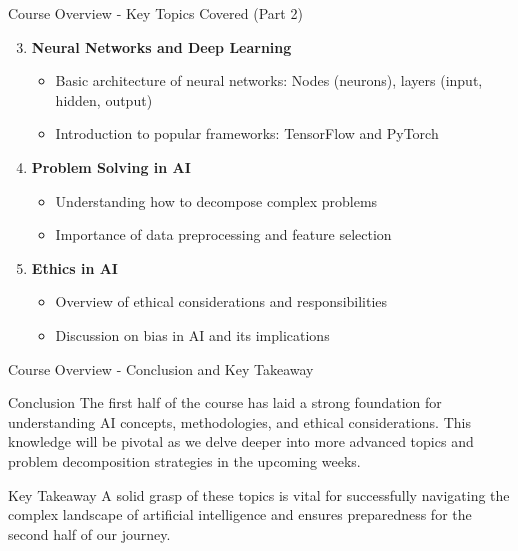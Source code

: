\documentclass[aspectratio=169]{beamer}
\begin{document}
\begin{frame}[fragile]{Course Overview - Key Topics Covered (Part 2)}
    \begin{enumerate}
        \setcounter{enumi}{2}
        \item \textbf{Neural Networks and Deep Learning}
        \begin{itemize}
            \item Basic architecture of neural networks: Nodes (neurons), layers (input, hidden, output)
            \item Introduction to popular frameworks: TensorFlow and PyTorch 
        \end{itemize}
        \item \textbf{Problem Solving in AI} 
        \begin{itemize}
            \item Understanding how to decompose complex problems 
            \item Importance of data preprocessing and feature selection
        \end{itemize}
        \item \textbf{Ethics in AI} 
        \begin{itemize}
            \item Overview of ethical considerations and responsibilities
            \item Discussion on bias in AI and its implications
        \end{itemize}
    \end{enumerate}
\end{frame}

\begin{frame}[fragile]{Course Overview - Conclusion and Key Takeaway}
    \begin{block}{Conclusion}
        The first half of the course has laid a strong foundation for understanding AI concepts, methodologies, and ethical considerations.
        This knowledge will be pivotal as we delve deeper into more advanced topics and problem decomposition strategies in the upcoming weeks.
    \end{block}
    
    \begin{block}{Key Takeaway}
        A solid grasp of these topics is vital for successfully navigating the complex landscape of artificial intelligence and ensures preparedness for the second half of our journey.
    \end{block}
\end{frame}
\end{document}
